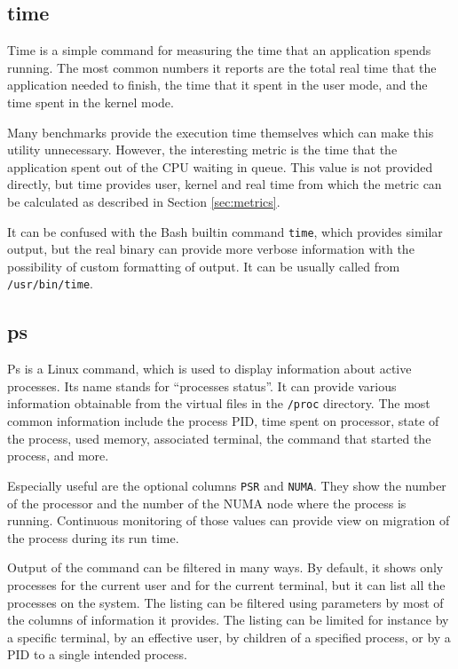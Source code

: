 \subsection{time}
Time is a simple command for measuring the time that an application spends
running. The most common numbers it reports are the total real time that the
application needed to finish, the time that it spent in the user mode, and the
time spent in the kernel mode.

Many benchmarks provide the execution time themselves which can make this
utility unnecessary. However, the interesting metric is the time that the
application spent out of the CPU waiting in queue. This value is not provided
directly, but time provides user, kernel and real time from which the metric can be
calculated as described in Section \ref{sec:metrics}.

It can be confused with the Bash builtin command \texttt{time}, which provides similar
output, but the real binary can provide more verbose information with
the possibility of custom formatting of output. It can be usually called from
\texttt{/usr/bin/time}.

\subsection{ps}
Ps is a Linux command, which is used to display information about active processes. Its name
stands for ``processes status''. It can provide various information obtainable from
the virtual files in the \texttt{/proc} directory. The most common information
include the process PID, time spent on processor, state of the process, used memory,
associated terminal, the command that started the process, and more.

Especially useful are the optional columns \texttt{PSR} and \texttt{NUMA}. They
show the number of the processor and the number of the NUMA node where the process is
running. Continuous monitoring of those values can provide view on migration of
the process during its run time. 

Output of the command can be filtered in many ways. By default, it shows only
processes for the current user and for the current terminal, but it can list all
the processes on the system. The listing can be filtered using parameters by
most of the columns of information it provides. The listing can be limited for
instance by a specific terminal, by an effective user, by children of a specified process,
or by a PID to a single intended process.

